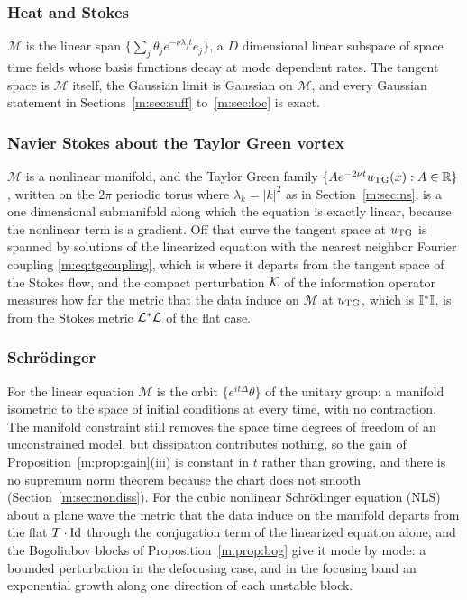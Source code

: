 \subsubsection{Heat and Stokes} $\mathcal M$ is the linear span $\{\sum_j\theta_je^{-\nu\lambda_jt}e_j\}$, a $D$ dimensional linear subspace of space time fields whose basis functions decay at mode dependent rates. The tangent space is $\mathcal M$ itself, the Gaussian limit is Gaussian on $\mathcal M$, and every Gaussian statement in Sections~\ref{m:sec:suff} to~\ref{m:sec:loc} is exact.

\subsubsection{Navier Stokes about the Taylor Green vortex} $\mathcal M$ is a nonlinear manifold, and the Taylor Green family $\{Ae^{-2\nu t}u_{\rm TG}(x):A\in\mathbb{R}\}$, written on the $2\pi$ periodic torus where $\lambda_k=|k|^2$ as in Section~\ref{m:sec:ns}, is a one dimensional submanifold along which the equation is exactly linear, because the nonlinear term is a gradient. Off that curve the tangent space at $u_{\rm TG}$ is spanned by solutions of the linearized equation with the nearest neighbor Fourier coupling \eqref{m:eq:tgcoupling}, which is where it departs from the tangent space of the Stokes flow, and the compact perturbation $\mathcal{K}$ of the information operator measures how far the metric that the data induce on $\mathcal M$ at $u_{\rm TG}$, which is $\mathbb{I}^*\mathbb{I}$, is from the Stokes metric $\mathcal{L}^*\mathcal{L}$ of the flat case.

\subsubsection{Schr\"odinger} For the linear equation $\mathcal M$ is the orbit $\{e^{it\Delta}\theta\}$ of the unitary group: a manifold isometric to the space of initial conditions at every time, with no contraction. The manifold constraint still removes the space time degrees of freedom of an unconstrained model, but dissipation contributes nothing, so the gain of Proposition~\ref{m:prop:gain}(iii) is constant in $t$ rather than growing, and there is no supremum norm theorem because the chart does not smooth (Section~\ref{m:sec:nondiss}). For the cubic nonlinear Schr\"odinger equation (NLS) about a plane wave the metric that the data induce on the manifold departs from the flat $T\cdot\operatorname{Id}$ through the conjugation term of the linearized equation alone, and the Bogoliubov blocks of Proposition~\ref{m:prop:bog} give it mode by mode: a bounded perturbation in the defocusing case, and in the focusing band an exponential growth along one direction of each unstable block.

